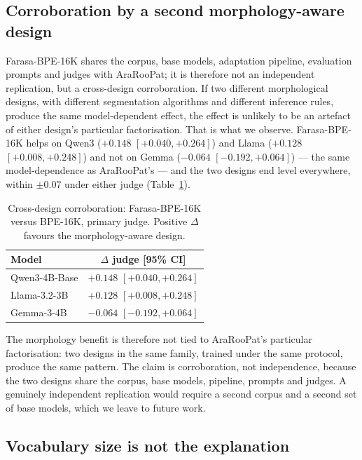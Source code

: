\documentclass[a4paper,fleqn]{cas-sc}
\begin{document}
\subsection{Corroboration by a second morphology-aware design}
\label{sec:results:corroboration}

Farasa-BPE-16K shares the corpus, base models, adaptation pipeline, evaluation prompts and judges with AraRooPat; it is therefore not an independent replication, but a cross-design corroboration. If two different morphological designs, with different segmentation algorithms and different inference rules, produce the same model-dependent effect, the effect is unlikely to be an artefact of either design's particular factorisation. That is what we observe. Farasa-BPE-16K helps on Qwen3 ($+0.148$ $[+0.040,+0.264]$) and Llama ($+0.128$ $[+0.008,+0.248]$) and not on Gemma ($-0.064$ $[-0.192,+0.064]$) --- the same model-dependence as AraRooPat's --- and the two designs end level everywhere, within $\pm 0.07$ under either judge (Table~\ref{tab:farasa}).

\begin{table}[t]
\centering
\caption{Cross-design corroboration: Farasa-BPE-16K versus BPE-16K, primary judge. Positive $\Delta$ favours the morphology-aware design.}
\label{tab:farasa}
\begin{tabular}{@{}lc@{}}
\toprule
Model & $\Delta$ judge [95\% CI] \\
\midrule
Qwen3-4B-Base & $+0.148$ $[+0.040,+0.264]$ \\
Llama-3.2-3B & $+0.128$ $[+0.008,+0.248]$ \\
Gemma-3-4B & $-0.064$ $[-0.192,+0.064]$ \\
\bottomrule
\end{tabular}
\end{table}

The morphology benefit is therefore not tied to AraRooPat's particular factorisation: two designs in the same family, trained under the same protocol, produce the same pattern. The claim is corroboration, not independence, because the two designs share the corpus, base models, pipeline, prompts and judges. A genuinely independent replication would require a second corpus and a second set of base models, which we leave to future work.

\subsection{Vocabulary size is not the explanation}
\label{sec:results:size}
\end{document}

